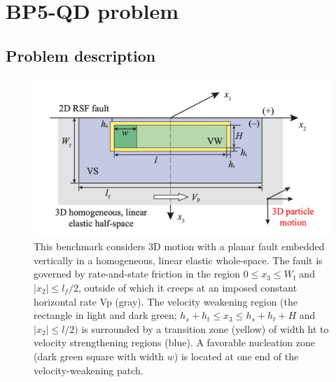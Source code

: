 \section{BP5-QD problem}
\subsection{Problem description}
\begin{figure}
    \centering
    \includegraphics[width=\linewidth]{figures/BP5-figure.png}
    \caption{This benchmark considers 3D motion with a planar fault embedded vertically in a homogeneous, linear elastic whole-space. The fault is governed by rate-and-state friction in the region $0 \leq x_3 \leq W_\text{f}$ and $|x_2| \leq l_f/2$, outside of which it creeps at an imposed constant horizontal rate Vp (gray). The velocity weakening region (the rectangle in light and dark green; $h_s + h_t \leq x_3 \leq h_s + h_t + H$ and $|x_2| \leq l/2)$ is surrounded by a transition zone (yellow) of width ht to velocity strengthening regions (blue). A favorable nucleation zone (dark green square with width $w$) is located at one end of the velocity-weakening patch. \citep{jiang2020seas}}
    \label{fig:BP5-figure}
\end{figure}


